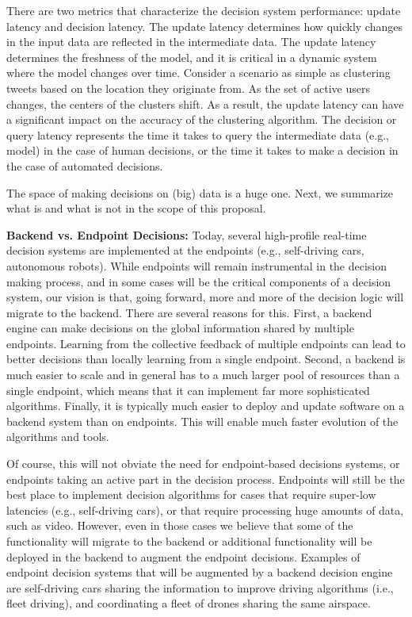There are two metrics that characterize the decision system performance: update latency and decision latency. The update latency determines how quickly changes in the input data are reflected in the intermediate data. The update latency determines the freshness of the model, and it is critical in a dynamic system where the model changes over time. Consider a scenario as simple as clustering tweets based on the location they originate from. As the set of active users changes, the centers of the clusters shift. As a result, the update latency can have a significant impact on the accuracy of the clustering algorithm. The decision or query latency represents the time it takes to query the intermediate data (e.g., model) in the case of human decisions, or the time it takes to make a decision in the case of automated decisions.


The space of making decisions on (big) data is a huge one. Next, we summarize what is and what is not in the scope of this proposal.

{\bf Backend vs. Endpoint Decisions:} Today, several high-profile real-time decision systems are implemented at the endpoints (e.g., self-driving cars, autonomous robots). While endpoints will remain instrumental in the decision making process, and in some cases will be the critical components of a decision system, our vision is that, going forward, more and more of the decision logic will migrate to the backend. There are several reasons for this. First, a backend engine can make decisions on the global information shared by multiple endpoints. Learning from the collective feedback of multiple endpoints can lead to better decisions than locally learning from a single endpoint. Second, a backend is much easier to scale and in general has to a much larger pool of resources than a single endpoint, which means that it can implement far more sophisticated algorithms. Finally, it is typically much easier to deploy and update software on a backend system than on endpoints. This will enable much faster evolution of the algorithms and tools.

Of course, this will not obviate the need for endpoint-based decisions systems, or endpoints taking an active part in the decision process. Endpoints will still be the best place to implement decision algorithms for cases that require super-low latencies (e.g., self-driving cars), or that require processing huge amounts of data, such as video. However, even in those cases we believe that some of the functionality will migrate to the backend or additional functionality will be deployed in the backend to augment the endpoint decisions. Examples of endpoint decision systems that will be augmented by a backend decision engine are self-driving cars sharing the information to improve driving algorithms (i.e., fleet driving), and coordinating a fleet of drones sharing the same airspace.  

